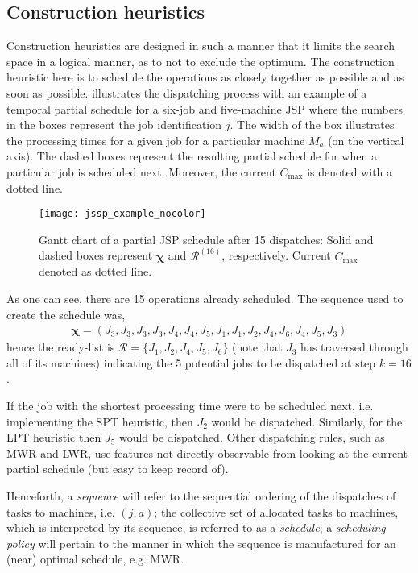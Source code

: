 \documentclass[smallextended]{svjour3}
\renewcommand{\vchi}{\bm \chi}
\begin{document}
\subsection{Construction heuristics}\label{sec:constructionjssp}
Construction heuristics are designed in such a manner that it limits the search space in a logical manner, as to not to exclude the optimum. The construction heuristic here is to schedule the operations as closely together as possible and as soon as possible.   illustrates the dispatching process with an example of a temporal partial schedule for a six-job and five-machine JSP where the numbers in the boxes represent the job identification $j$. The width of the box illustrates the processing times for a given job for a particular machine $M_a$ (on the vertical axis). The dashed boxes represent the resulting partial schedule for when a particular job is scheduled next. Moreover, the current $C_{\max}$ is denoted with a dotted line.

\begin{figure}[t!]\centering 
\texttt{[image: jssp\_example\_nocolor]}
\caption[Gantt chart of a partial JSP schedule]{Gantt chart of a partial JSP schedule after 15 dispatches: Solid and dashed boxes represent $\vchi$ and $\mathcal{R}^{(16)}$, respectively. Current $C_{\max}$ denoted as dotted line.}
\label{fig:jssp:example}
\end{figure}

As one can see, there are 15 operations already scheduled. The sequence used to create the schedule was,
\begin{eqnarray}
\vchi=\left(J_3,J_3,J_3,J_3,J_4,J_4,J_5,J_1,J_1,J_2,J_4,J_6,J_4,J_5,J_3\right)
\end{eqnarray}
hence the ready-list is $\mathcal{R}=\{J_1,J_2,J_4,J_5,J_6\}$ (note that $J_3$ has traversed through all of its machines) indicating the 5 potential jobs to be dispatched at step $k=16$.

If the job with the shortest processing time were to be scheduled next, i.e. implementing the SPT heuristic, then $J_2$ would be dispatched. Similarly, for the LPT heuristic then $J_5$ would be dispatched. 
Other dispatching rules, such as MWR and LWR, use features not directly observable from looking at the current partial schedule (but easy to keep record of).

Henceforth, a \emph{sequence} will refer to the sequential ordering of the dispatches of tasks to machines, i.e. $(j,a)$; the collective set of allocated tasks to machines, which is interpreted by its sequence, is referred to as a \emph{schedule}; a \emph{scheduling policy} will pertain to the manner in which the sequence is manufactured for an (near) optimal schedule, e.g. MWR.
\end{document}
